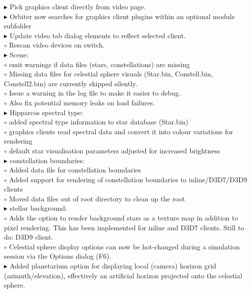\documentclass[Orbiter User Manual.tex]{subfiles}
\begin{document}
\begin{sloppypar}
$\blacktriangleright$ Pick graphics client directly from video page.\\
$\blacktriangleright$ Orbiter now searches for graphics client plugins within an optional module subfolder\\
$\blacktriangleright$ Update video tab dialog elements to reflect selected client.\\
$\circ$ Rescan video devices on switch.\\
$\blacktriangleright$ Scene:\\
$\circ$ emit warnings if data files (stars, constellations) are missing\\
$\circ$ Missing data files for celestial sphere visuals (Star.bin, Constell.bin, Constell2.bin) are currently skipped silently.\\
$\circ$ Issue a warning in the log file to make it easier to debug.\\
$\circ$ Also fix potential memory leaks on load failures.\\
$\blacktriangleright$ Hipparcos spectral type:\\
$\circ$ added spectral type information to star database (Star.bin)\\
$\circ$ graphics clients read spectral data and convert it into colour variations for rendering\\
$\circ$ default star visualisation parameters adjusted for increased brightness\\
$\blacktriangleright$ constellation boundaries:\\
$\circ$ Added data file for constellation boundaries\\
$\circ$ Added support for rendering of constellation boundaries to inline/D3D7/D3D9 clients\\
$\circ$ Moved data files out of root directory to clean up the root\\
$\blacktriangleright$ stellar background:\\
$\circ$ Adds the option to render background stars as a texture map in addition to pixel rendering. This has been implemented for inline and D3D7 clients. Still to do: D3D9 client.\\
$\circ$ Celestial sphere display options can now be hot-changed during a simulation session via the Options dialog (F6).\\
$\blacktriangleright$ Added planetarium option for displaying local (camera) horizon grid (azimuth/elevation), effectively an artificial horizon projected onto the celestial sphere.\\

\end{sloppypar}
\end{document}
